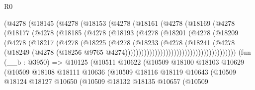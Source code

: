 \begin{lexlean}{R0}
\begin{coremodule}
                          (@4278
                            (@18145
                              (@4278
                                (@18153
                                  (@4278
                                    (@18161
                                      (@4278
                                        (@18169
                                          (@4278
                                            (@18177
                                              (@4278
                                                (@18185
                                                  (@4278
                                                    (@18193
                                                      (@4278
                                                        (@18201
                                                          (@4278
                                                            (@18209
                                                              (@4278
                                                                (@18217
                                                                  (@4278
                                                                    (@18225
                                                                      (@4278
                                                                        (@18233
                                                                          (@4278
                                                                            (@18241
                                                                              (@4278
                                                                                (@18249
                                                                                  (@4278
                                                                                    (@18256
                                                                                      @9765
                                                                                      @4274)))))))))))))))))))))))))))))))))))))))))
    (fun (__b : @3950) =>
    @10125
      (@10511
        @10622
        (@10509
          @18100
          @18103
          @10629
          (@10509
            @18108
            @18111
            @10636
            (@10509
              @18116
              @18119
              @10643
              (@10509
                @18124
                @18127
                @10650
                (@10509
                  @18132
                  @18135
                  @10657
                  (@10509

\end{coremodule}
\end{lexlean}
